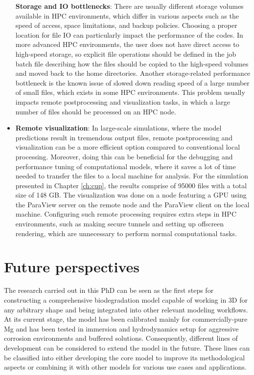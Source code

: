 \begin{itemize}
\textbf{Storage and \gls{IO} bottlenecks}: There are usually different storage volumes available in \gls{HPC} environments, which differ in various aspects such as the speed of access, space limitations, and backup policies. Choosing a proper location for file \gls{IO} can particularly impact the performance of the codes. In more advanced \gls{HPC} environments, the user does not have direct access to high-speed storage, so explicit file operations should be defined in the job batch file describing how the files should be copied to the high-speed volumes and moved back to the home directories. Another storage-related performance bottleneck is the known issue of slowed down reading speed of a large number of small files, which exists in some \gls{HPC} environments. This problem usually impacts remote postprocessing and visualization tasks, in which a large number of files should be processed on an \gls{HPC} node.
\item
\textbf{Remote visualization}: In large-scale simulations, where the model predictions result in tremendous output files, remote postprocessing and visualization can be a more efficient option compared to conventional local processing. Moreover, doing this can be beneficial for the debugging and performance tuning of computational models, where it saves a lot of time needed to transfer the files to a local machine for analysis. For the simulation presented in Chapter \ref{ch:cup}, the results comprise of \num{95000} files with a total size of 148 GB. The visualization was done on a node featuring a \gls{GPU} using the ParaView server on the remote node and the ParaView client on the local machine. Configuring such remote processing requires extra steps in \gls{HPC} environments, such as making secure tunnels and setting up offscreen rendering, which are unnecessary to perform normal computational tasks.
\end{itemize}


\section{Future perspectives}


The research carried out in this PhD can be seen as the first steps for constructing a comprehensive biodegradation model capable of working in 3D for any arbitrary shape and being integrated into other relevant modeling workflows. At its current stage, the model has been calibrated mainly for commercially-pure Mg and has been tested in immersion and hydrodynamics setup for aggressive corrosion environments and buffered solutions. Consequently, different lines of development can be considered to extend the model in the future. These lines can be classified into either developing the core model to improve its methodological aspects or combining it with other models for various use cases and applications.

